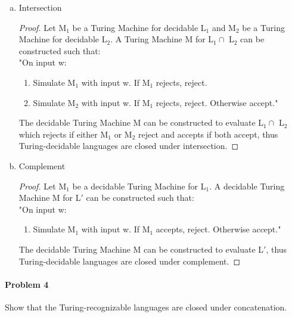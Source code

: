 ﻿\documentclass{article}
\begin{document}
\begin{enumerate}[a)]
\begin{enumerate}[a)]
\begin{proof}
The decidable Turing Machine M can be constructed to evaluate L$_{1} \cup$ L$_{2}$ which accepts if either M$_{1}$ or M$_{2}$ accepts and rejects if both reject, thus Turing-decidable languages are closed under union.

\end{proof}

\item Intersection

\begin{proof}

Let M$_{1}$ be a Turing Machine for decidable L$_{1}$ and M$_{2}$ be a Turing Machine for decidable L$_{2}$. A Turing Machine M for L$_{1} \cap$ L$_{2}$ can be constructed such that:
\\"On input w:

\begin{enumerate} [1.]
\item Simulate M$_{1}$ with input w. If M$_{1}$ rejects, reject.
\item Simulate M$_{2}$ with input w. If M$_{1}$ rejects, reject. Otherwise accept."
\end{enumerate}

The decidable Turing Machine M can be constructed to evaluate L$_{1} \cap$ L$_{2}$ which rejects if either M$_{1}$ or M$_{2}$ reject and accepts if both accept, thus Turing-decidable languages are closed under intersection.
\end{proof}

\item Complement

\begin{proof}

Let M$_{1}$ be a decidable Turing Machine for L$_{1}$. A decidable Turing Machine M for L$'$ can be constructed such that:
\\"On input w:

\begin{enumerate} [1.]
\item Simulate M$_{1}$ with input w. If M$_{1}$ accepts, reject. Otherwise accept."
\end{enumerate}

The decidable Turing Machine M can be constructed to evaluate L$'$, thus Turing-decidable languages are closed under complement.

\end{proof}

\end{enumerate}


\paragraph{Problem 4} Show that the Turing-recognizable languages are closed under concatenation.


\end{enumerate}
\end{document}
